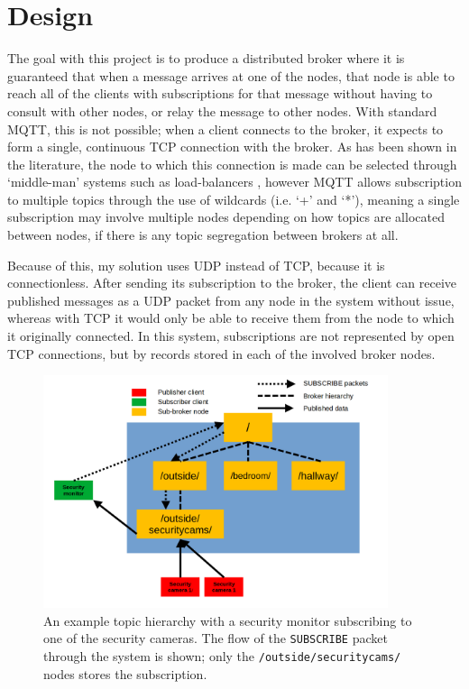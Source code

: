 \documentclass[conference, a4paper]{IEEEtran}
\begin{document}
    \section{Design}
        The goal with this project is to produce a distributed broker where it is guaranteed that when a message arrives at one of the nodes, that node is able to reach all of the clients with subscriptions for that message without having to consult with other nodes, or relay the message to other nodes.
        With standard MQTT, this is not possible; when a client connects to the broker, it expects to form a single, continuous TCP connection with the broker.
        As has been shown in the literature, the node to which this connection is made can be selected through `middle-man' systems such as load-balancers \autocite{jutadhamakorn17}, however MQTT allows subscription to multiple topics through the use of wildcards (i.e. `+' and `*'), meaning a single subscription may involve multiple nodes depending on how topics are allocated between nodes, if there is any topic segregation between brokers at all.


        Because of this, my solution uses UDP instead of TCP, because it is connectionless.
        After sending its subscription to the broker, the client can receive published messages as a UDP packet from any node in the system without issue, whereas with TCP it would only be able to receive them from the node to which it originally connected.
        In this system, subscriptions are not represented by open TCP connections, but by records stored in each of the involved broker nodes.


        \begin{figure}[t]
            \centering
            \includegraphics[width=0.9\textwidth]{fig1.png} 
            \caption{An example topic hierarchy with a security monitor subscribing to one of the security cameras. The flow of the \texttt{SUBSCRIBE} packet through the system is shown; only the \texttt{/outside/securitycams/} nodes stores the subscription.}
            \label{fig:one}
        \end{figure}
        
\end{document}
